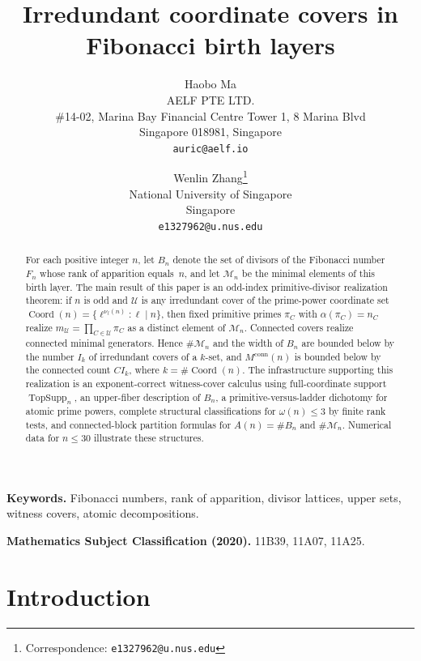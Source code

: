 \documentclass[11pt,letterpaper]{article}
\title{Irredundant coordinate covers in Fibonacci birth layers}
\author{
Haobo Ma\\
AELF PTE LTD.\\
\#14-02, Marina Bay Financial Centre Tower 1, 8 Marina Blvd\\
Singapore 018981, Singapore\\
\texttt{auric@aelf.io}
\and
Wenlin Zhang\thanks{Correspondence: \texttt{e1327962@u.nus.edu}}\\
National University of Singapore\\
Singapore\\
\texttt{e1327962@u.nus.edu}
}
\date{}
\numberwithin{equation}{section}
\theoremstyle{plain}
\theoremstyle{definition}
\theoremstyle{remark}
\DeclareMathOperator{\Coord}{Coord}
\DeclareMathOperator{\TopSupp}{TopSupp}
\begin{document}
\maketitle

\begin{abstract}
For each positive integer $n$, let $B_n$ denote the set of divisors of the
Fibonacci number $F_n$ whose rank of apparition equals~$n$, and let
$\mathcal M_n$ be the minimal elements of this birth layer.  The main result
of this paper is an odd-index primitive-divisor realization theorem: if $n$ is
odd and $\mathcal U$ is any irredundant cover of the prime-power coordinate set
$\Coord(n)=\{\ell^{\nu_\ell(n)}:\ell\mid n\}$, then fixed primitive primes
$\pi_C$ with $\alpha(\pi_C)=n_C$ realize
$m_{\mathcal U}=\prod_{C\in\mathcal U}\pi_C$ as a distinct element of
$\mathcal M_n$. Connected covers realize connected minimal generators. Hence
$\#\mathcal M_n$ and the width of $B_n$ are bounded below by the number $I_k$
of irredundant covers of a $k$-set, and $M^{\mathrm{conn}}(n)$ is bounded
below by the connected count $CI_k$, where $k=\#\Coord(n)$.  The infrastructure
supporting this realization is an exponent-correct witness-cover calculus
using full-coordinate support $\TopSupp_n$, an upper-fiber description of
$B_n$, a primitive-versus-ladder dichotomy for atomic prime powers, complete
structural classifications for $\omega(n)\le3$ by finite rank tests, and
connected-block partition formulas for $A(n)=\#B_n$ and $\#\mathcal M_n$.
Numerical data for $n\le30$ illustrate these structures.
\end{abstract}

\medskip
\noindent\textbf{Keywords.} Fibonacci numbers, rank of apparition, divisor
lattices, upper sets, witness covers, atomic decompositions.

\smallskip
\noindent\textbf{Mathematics Subject Classification (2020).}
11B39, 11A07, 11A25.

\section{Introduction}\label{sec:intro}
\end{document}
